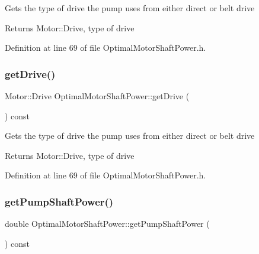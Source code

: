 Gets the type of drive the pump uses from either direct or belt drive \begin{DoxyReturn}{Returns}
Motor\+::\+Drive, type of drive 
\end{DoxyReturn}


Definition at line 69 of file Optimal\+Motor\+Shaft\+Power.\+h.

\mbox{\label{class_optimal_motor_shaft_power_a3cc369285d8b3582fcd8c44e5a1c37c8}} 
\subsubsection{\texorpdfstring{get\+Drive()}{getDrive()}\hspace{0.1cm}{\footnotesize\ttfamily [3/3]}}
{\footnotesize\ttfamily Motor\+::\+Drive Optimal\+Motor\+Shaft\+Power\+::get\+Drive (\begin{DoxyParamCaption}{ }\end{DoxyParamCaption}) const\hspace{0.3cm}{\ttfamily [inline]}}

Gets the type of drive the pump uses from either direct or belt drive \begin{DoxyReturn}{Returns}
Motor\+::\+Drive, type of drive 
\end{DoxyReturn}


Definition at line 69 of file Optimal\+Motor\+Shaft\+Power.\+h.

\mbox{\label{class_optimal_motor_shaft_power_aca7bb632c659ecf2ebf3cb9fdb23626f}} 
\subsubsection{\texorpdfstring{get\+Pump\+Shaft\+Power()}{getPumpShaftPower()}\hspace{0.1cm}{\footnotesize\ttfamily [1/3]}}
{\footnotesize\ttfamily double Optimal\+Motor\+Shaft\+Power\+::get\+Pump\+Shaft\+Power (\begin{DoxyParamCaption}{ }\end{DoxyParamCaption}) const\hspace{0.3cm}{\ttfamily [inline]}}

